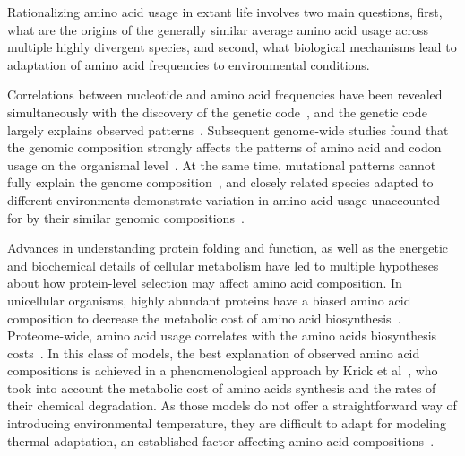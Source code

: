 \documentclass[10pt,letterpaper]{article}
\begin{document}
Rationalizing amino acid usage in extant life involves two main questions, first, what are the origins of the generally similar average amino acid usage across multiple highly divergent species, and second, what biological mechanisms lead to adaptation of amino acid frequencies to environmental conditions. 



Correlations between nucleotide and amino acid frequencies have been revealed simultaneously with the discovery of the genetic code~\cite{Sueoka1961Correlation}, and the genetic code largely explains observed patterns~\cite{Jukes1975Amino,King1969NonDarwinian}. Subsequent genome-wide studies found that the genomic composition strongly affects the patterns of amino acid and codon usage on the organismal level~\cite{Kreil2001Identification,Knight2001Simple,Lightfield2011Across,Goncearenco2014Fundamental}. At the same time, mutational patterns cannot fully explain the genome composition~\cite{Rocha2010Mutational}, and closely related species adapted to different environments demonstrate variation in amino acid usage unaccounted for by their similar genomic compositions~\cite{Singer2003Thermophilic,Mcdonald2010Temperature,Haney1999Thermal,Fukuchi2003Unique}. 

Advances in understanding protein folding and function, as well as the energetic and biochemical details of cellular metabolism have led to multiple hypotheses about how protein-level selection may affect amino acid composition. In unicellular organisms, highly abundant proteins have a biased amino acid composition to decrease the metabolic cost of amino acid biosynthesis~\cite{Akashi2002Metabolic,Heizer2006Amino}.  Proteome-wide, amino acid usage correlates with the amino acids biosynthesis costs~\cite{Seligmann2003CostMinimization,Heizer2011Amino}. In this class of models, the best explanation of observed amino acid compositions is achieved in a phenomenological approach by Krick et al~\cite{Krick2014Amino}, who took into account the metabolic cost of amino acids synthesis and the rates of their chemical degradation.  As those models do not offer a straightforward way of introducing environmental temperature, they are difficult to adapt for modeling thermal adaptation, an established factor affecting amino acid compositions~\cite{Zeldovich2007Protein,Singer2003Thermophilic,Kreil2001Identification,Haney1999Thermal}.
\end{document}
